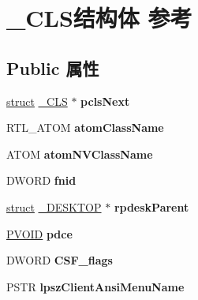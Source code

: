 \hypertarget{struct___c_l_s}{}\section{\+\_\+\+C\+L\+S结构体 参考}
\label{struct___c_l_s}
\subsection*{Public 属性}
\begin{DoxyCompactItemize}
\item 
\mbox{\label{struct___c_l_s_aedb113061dfa6664d2c978fb02d98a5c}} 
\hyperlink{interfacestruct}{struct} \hyperlink{struct___c_l_s}{\+\_\+\+C\+LS} $\ast$ {\bfseries pcls\+Next}
\item 
\mbox{\label{struct___c_l_s_accdd2d040f2b866658bc574d808eac3a}} 
R\+T\+L\+\_\+\+A\+T\+OM {\bfseries atom\+Class\+Name}
\item 
\mbox{\label{struct___c_l_s_a9497ad5d2b003125a897f253ff1dd396}} 
A\+T\+OM {\bfseries atom\+N\+V\+Class\+Name}
\item 
\mbox{\label{struct___c_l_s_ae6792e9554dd494506c075d2e871b6f4}} 
D\+W\+O\+RD {\bfseries fnid}
\item 
\mbox{\label{struct___c_l_s_a2279b176b9bdda0615570b87ce77748c}} 
\hyperlink{interfacestruct}{struct} \hyperlink{struct___d_e_s_k_t_o_p}{\+\_\+\+D\+E\+S\+K\+T\+OP} $\ast$ {\bfseries rpdesk\+Parent}
\item 
\mbox{\label{struct___c_l_s_af38477d3aa2f4719379641da69614dd2}} 
\hyperlink{interfacevoid}{P\+V\+O\+ID} {\bfseries pdce}
\item 
\mbox{\label{struct___c_l_s_aa0673e8f430c76f0af879962b9d2c064}} 
D\+W\+O\+RD {\bfseries C\+S\+F\+\_\+flags}
\item 
\mbox{\label{struct___c_l_s_a96c44ff3e2c1ccee013abe17d8a820d4}} 
P\+S\+TR {\bfseries lpsz\+Client\+Ansi\+Menu\+Name}
\item 
\mbox{\label{struct___c_l_s_aa999a2b120222fa43114de0ca1781b0c}} 

\end{DoxyCompactItemize}
